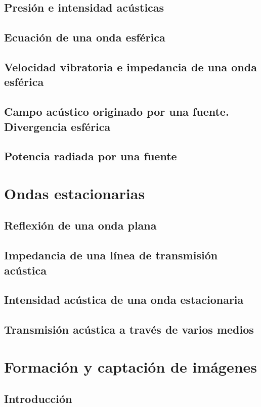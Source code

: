 \documentclass[a4paper]{book}
\begin{document}
\section{Presión e intensidad acústicas}
\section{Ecuación de una onda esférica}
\section[Velocidad vibratoria e impedancia de una onda esférica]{Velocidad vibratoria e impedancia de una onda\\ esférica}
\section{Campo acústico originado por una fuente. Divergencia esférica}
\section{Potencia radiada por una fuente}

\chapter{Ondas estacionarias}
\section{Reflexión de una onda plana}
\section{Impedancia de una línea de transmisión acústica}
\section{Intensidad acústica de una onda estacionaria}
\section{Transmisión acústica a través de varios medios}

\chapter{Formación y captación de imágenes}
\section{Introducción}
\end{document}
